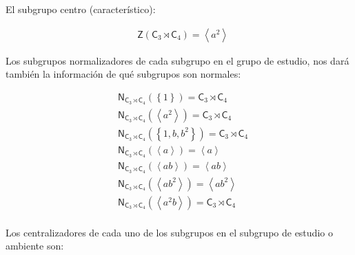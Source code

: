 \documentclass[12pt,a4paper,fleqn,spanish,final,openright]{extbook}
\theoremstyle{definition}
\theoremstyle{remark}
\begin{document}
El subgrupo centro (característico):

\begin{align*}
&\mathsf{Z}\left({{{\mathsf{C}}_{3}}\rtimes{{\mathsf{C}}_{4}}}\right)
= {\left\langle{a^2}\right\rangle}
\end{align*}

Los subgrupos normalizadores de cada subgrupo en el grupo de estudio,
nos dará también la información de qué subgrupos son normales:

\begin{align*}
&{\mathsf{N}}_{{{\mathsf{C}}_{3}}\rtimes{{\mathsf{C}}_{4}}}
\left({\left\lbrace{1}\right\rbrace}\right) =
{{{\mathsf{C}}_{3}}\rtimes{{\mathsf{C}}_{4}}}\\
&{\mathsf{N}}_{{{\mathsf{C}}_{3}}\rtimes{{\mathsf{C}}_{4}}}
\left({\left\langle{a^2}\right\rangle}\right) =
{{{\mathsf{C}}_{3}}\rtimes{{\mathsf{C}}_{4}}}\\
&{\mathsf{N}}_{{{\mathsf{C}}_{3}}\rtimes{{\mathsf{C}}_{4}}}
\left({\left\lbrace{1,b,b^2}\right\rbrace}\right) =
{{{\mathsf{C}}_{3}}\rtimes{{\mathsf{C}}_{4}}}\\
&{\mathsf{N}}_{{{\mathsf{C}}_{3}}\rtimes{{\mathsf{C}}_{4}}}
\left({\left\langle{a}\right\rangle}\right) =
{\left\langle{a}\right\rangle}\\
&{\mathsf{N}}_{{{\mathsf{C}}_{3}}\rtimes{{\mathsf{C}}_{4}}}
\left({\left\langle{ab}\right\rangle}\right) =
{\left\langle{ab}\right\rangle}\\
&{\mathsf{N}}_{{{\mathsf{C}}_{3}}\rtimes{{\mathsf{C}}_{4}}}
\left({\left\langle{ab^2}\right\rangle}\right) =
{\left\langle{ab^2}\right\rangle}\\
&{\mathsf{N}}_{{{\mathsf{C}}_{3}}\rtimes{{\mathsf{C}}_{4}}}
\left({\left\langle{a^2b}\right\rangle}\right) =
{{{\mathsf{C}}_{3}}\rtimes{{\mathsf{C}}_{4}}}\\
\end{align*}

Los centralizadores de cada uno de los subgrupos en el subgrupo de estudio o ambiente son:
\end{document}

